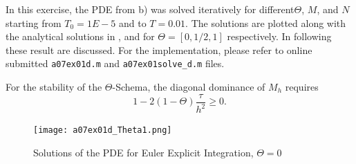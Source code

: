 %
In this exercise, the PDE from b) was solved iteratively for different$\Theta$, $M$, and $N$ starting from $T_0=1E-5$ and to $T = 0.01$.
The solutions are plotted along with the analytical solutions in ,  and  for $\Theta = [0, 1/2, 1]$ respectively.
In following these result are discussed.
For the implementation, please refer to online submitted \texttt{a07ex01d.m} and \texttt{a07ex01solve\_d.m} files.
\par
For the stability of the $\Theta$-Schema, the diagonal dominance of $M_h$ requires
\begin{equation}
	\label{eq:stabReq}
	1-2(1-\Theta) \frac{\tau}{h^2} \geq 0 \text{.}
\end{equation}
%
\begin{figure}[h]
\vspace*{\FigUpperVSpace}
	\texttt{[image: a07ex01d\_Theta1.png]} 
	\caption{Solutions of the PDE for Euler Explicit Integration, $\Theta = 0$}
	\label{fig:a07ex01d_Theta1}
\end{figure}

